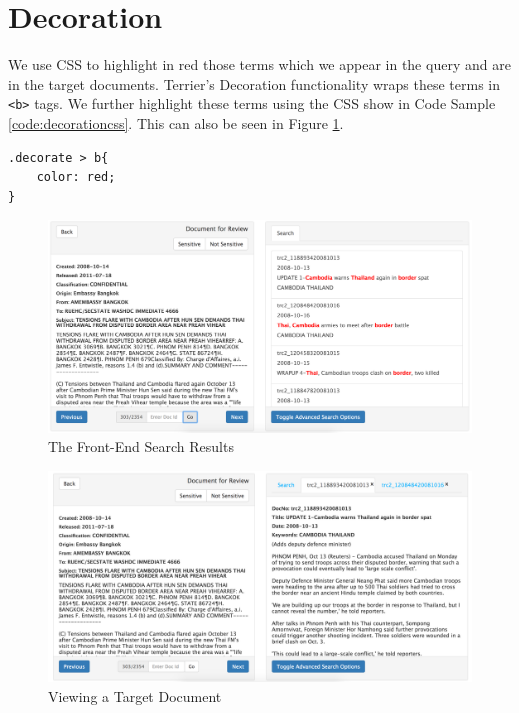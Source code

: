 \documentclass{l4proj}
\newcommand{\code}[1]{\texttt{#1}}
\newenvironment{codelisting}{\captionsetup{type=listing}}{}
\begin{document}
\section{Decoration}
We use CSS to highlight in red those terms which we appear in the query and are in the target documents. Terrier's Decoration functionality wraps these terms in \code{<b>} tags. We further highlight these terms using the CSS show in Code Sample \ref{code:decorationcss}. This can also be seen in Figure \ref{relevant_results_full}.
\begin{codelisting}
\begin{verbatim}
.decorate > b{
    color: red;
}
\end{verbatim}
\label{code:decorationcss}
\end{codelisting}

\begin{figure}[H]
\centering
\includegraphics[scale=0.30]{images/searchresults}
\caption{The Front-End Search Results}
\label{relevant_results_full}
\end{figure}
\begin{figure}[H]
\centering
\includegraphics[scale=0.30]{images/targetdocument}
\caption{Viewing a Target Document}
\label{target_doc_view}
\end{figure}
\end{document}

